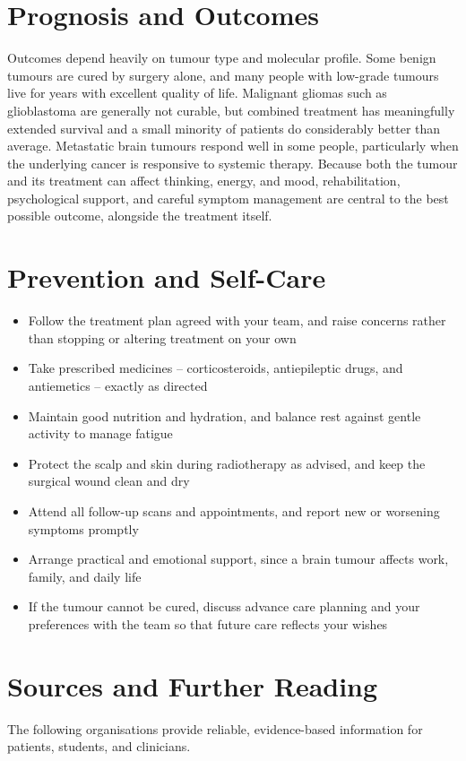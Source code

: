 \section*{Prognosis and Outcomes}
Outcomes depend heavily on tumour type and molecular profile. Some benign tumours are cured by surgery alone, and many people with low-grade tumours live for years with excellent quality of life. Malignant gliomas such as glioblastoma are generally not curable, but combined treatment has meaningfully extended survival and a small minority of patients do considerably better than average. Metastatic brain tumours respond well in some people, particularly when the underlying cancer is responsive to systemic therapy. Because both the tumour and its treatment can affect thinking, energy, and mood, rehabilitation, psychological support, and careful symptom management are central to the best possible outcome, alongside the treatment itself.

\section*{Prevention and Self-Care}
\begin{itemize}
    \item Follow the treatment plan agreed with your team, and raise concerns rather than stopping or altering treatment on your own
    \item Take prescribed medicines -- corticosteroids, antiepileptic drugs, and antiemetics -- exactly as directed
    \item Maintain good nutrition and hydration, and balance rest against gentle activity to manage fatigue
    \item Protect the scalp and skin during radiotherapy as advised, and keep the surgical wound clean and dry
    \item Attend all follow-up scans and appointments, and report new or worsening symptoms promptly
    \item Arrange practical and emotional support, since a brain tumour affects work, family, and daily life
    \item If the tumour cannot be cured, discuss advance care planning and your preferences with the team so that future care reflects your wishes
\end{itemize}

\section*{Sources and Further Reading}
The following organisations provide reliable, evidence-based information for patients, students, and clinicians.

